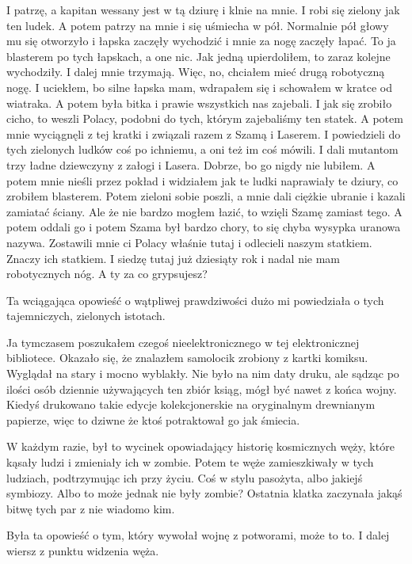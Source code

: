 \begin{poem}
	I patrzę, a kapitan wessany jest w tą dziurę i klnie na mnie. I robi się zielony jak ten ludek.
	A potem patrzy na mnie i się uśmiecha w pół. Normalnie pół głowy mu się otworzyło i łapska zaczęły wychodzić i mnie za nogę zaczęły łapać. 
	To ja blasterem po tych łapskach, a one nic. Jak jedną upierdoliłem, to zaraz kolejne wychodziły. I dalej mnie trzymają.
	Więc, no, chciałem mieć drugą robotyczną nogę.
	I uciekłem, bo silne łapska mam, wdrapałem się i schowałem w kratce od wiatraka.
	A potem była bitka i prawie wszystkich nas zajebali.
	I jak się zrobiło cicho, to weszli Polacy, podobni do tych, którym zajebaliśmy ten statek.
	A potem mnie wyciągnęli z tej kratki i związali razem z Szamą i Laserem.
	I powiedzieli do tych zielonych ludków coś po ichniemu, a oni też im coś mówili. I dali mutantom trzy ładne dziewczyny z załogi i Lasera.
	Dobrze, bo go nigdy nie lubiłem.
	A potem mnie nieśli przez pokład i widziałem jak te ludki naprawiały te dziury, co zrobiłem blasterem.
	Potem zieloni sobie poszli, a mnie dali ciężkie ubranie i kazali zamiatać ściany. Ale że nie bardzo mogłem łazić, to wzięli Szamę zamiast tego.
	A potem oddali go i potem Szama był bardzo chory, to się chyba wysypka uranowa nazywa.
	Zostawili mnie ci Polacy właśnie tutaj i odlecieli naszym statkiem. Znaczy ich statkiem.
	I siedzę tutaj już dziesiąty rok i nadal nie mam robotycznych nóg. A ty za co grypsujesz?
\end{poem}

Ta wciągająca opowieść o wątpliwej prawdziwości dużo mi powiedziała o tych tajemniczych, zielonych istotach.

Ja tymczasem poszukałem czegoś nieelektronicznego w tej elektronicznej bibliotece.
Okazało się, że znalazłem samolocik zrobiony z kartki komiksu.
Wyglądał na stary i mocno wyblakły. Nie było na nim daty druku, ale sądząc po ilości osób dziennie używających ten zbiór ksiąg, mógł być nawet z końca wojny.
Kiedyś drukowano takie edycje kolekcjonerskie na oryginalnym drewnianym papierze, więc to dziwne że ktoś potraktował go jak śmiecia.

W każdym razie, był to wycinek opowiadający historię kosmicznych węży, które kąsały ludzi i zmieniały ich w zombie.
Potem te węże zamieszkiwały w tych ludziach, podtrzymując ich przy życiu. Coś w stylu pasożyta, albo jakiejś symbiozy.
Albo to może jednak nie były zombie? 
Ostatnia klatka zaczynała jakąś bitwę tych par z nie wiadomo kim.

Była ta opowieść o tym, który wywołał wojnę z potworami, może to to.
I dalej wiersz z punktu widzenia węża.

